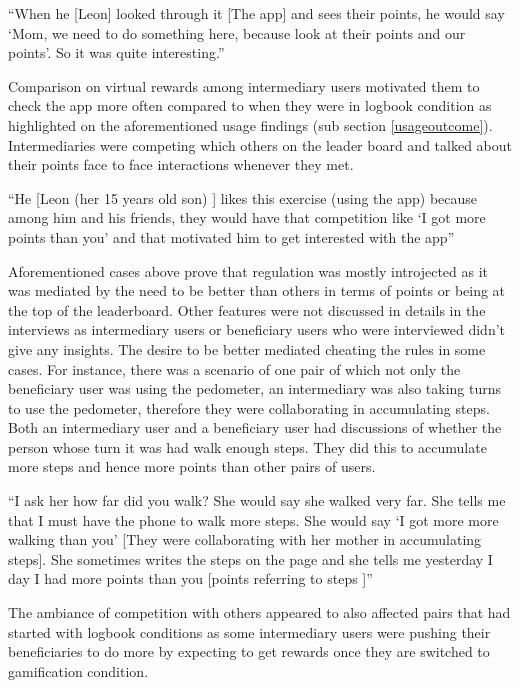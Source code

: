  {``When he [Leon] looked through it [The app] and sees their points, he would say `Mom, we need to do something here, because look at their points and our points'. So it was quite interesting.''} 

Comparison on virtual rewards among intermediary users motivated them to check the app more often compared to when they were in logbook condition as highlighted on the aforementioned usage findings (sub section \ref{usageoutcome}). Intermediaries were competing which others on the leader board and talked about their points face to face interactions whenever they met. 

 {``He [Leon (her 15 years old son) ] likes this exercise (using the app) because among him and his friends, they would have that competition like `I got more points than you' and that motivated him to get interested with the app''} 

Aforementioned cases above prove that regulation was mostly introjected as it was mediated by the need to be better than others in terms of points or being at the top of the leaderboard. Other features were not discussed in details in the interviews as intermediary users or beneficiary users who were interviewed didn't give any insights. The desire to be better mediated cheating the rules in some cases. For instance, there was a scenario of one pair of which not only the beneficiary user was using the pedometer, an intermediary was also taking turns to use the pedometer, therefore they were collaborating in accumulating steps. Both an intermediary user and a beneficiary user had discussions of whether the person whose turn it was had walk enough steps. They did this to accumulate more steps and hence more points than other pairs of users. 

 {``I ask her how far did you walk?  She would say she walked very far. She tells me that I must have the phone to walk more steps. She would say `I got more more walking than you' [They were collaborating with her mother in accumulating steps]. She sometimes writes the steps on the page and she tells me yesterday I day I had more points than you [points referring to steps ]''} 

The ambiance of competition with others appeared to also affected pairs that had started with logbook conditions as some intermediary users were pushing their beneficiaries to do more by expecting to get rewards once they are switched to gamification condition.

